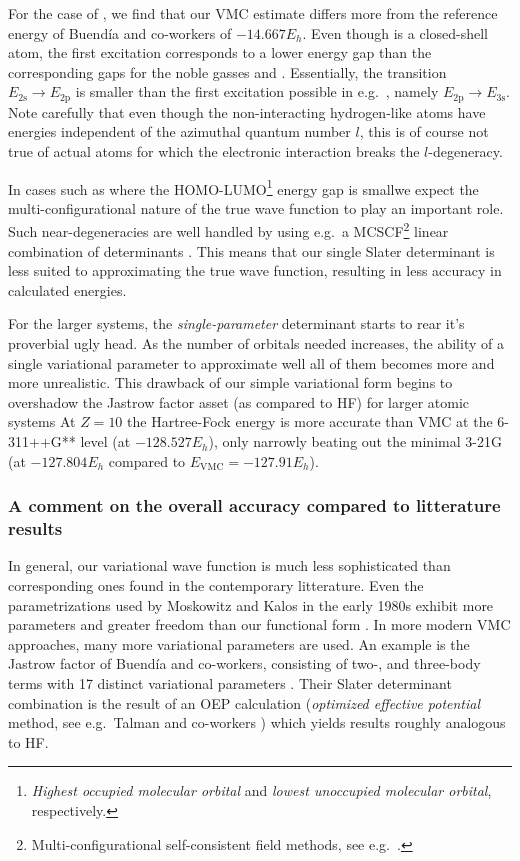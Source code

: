 \documentclass[../../master.tex]{subfiles}
\begin{document}
For the case of , we find that our VMC estimate differs more from the reference energy of Buendía and co-workers of $-14.667 E_h$. Even though  is a closed-shell atom, the first excitation corresponds to a lower energy gap than the corresponding gaps for the noble gasses  and . Essentially, the transition $E_\text{2s}\rightarrow E_\text{2p}$ is smaller than the first excitation possible in e.g.\ , namely $E_\text{2p}\rightarrow E_\text{3s}$. Note carefully that even though the non-interacting hydrogen-like atoms have energies independent of the azimuthal quantum number $l$, this is of course not true of actual atoms for which the electronic interaction breaks the $l$-degeneracy.  

In cases such as \textemdash where the HOMO-LUMO\footnote{\emph{Highest occupied molecular orbital} and \emph{lowest unoccupied molecular orbital}, respectively.} energy gap is small\textemdash we expect the multi-configurational nature of the true wave function to play an important role. Such near-degeneracies are well handled by using e.g.\ a MCSCF\footnote{Multi-configurational self-consistent field methods, see e.g.\ \cite{helgaker}.} linear combination of determinants \cite{BUENDIA2006241}. This means that our single Slater determinant is less suited to approximating the true wave function, resulting in less accuracy in calculated energies.

For the larger systems, the \emph{single-parameter} determinant starts to rear it's proverbial ugly head. As the number of orbitals needed increases, the ability of a single variational parameter to approximate well all of them becomes more and more unrealistic. This drawback of our simple variational form begins to overshadow the Jastrow factor asset (as compared to HF) for larger atomic systems At $Z=10$ the Hartree-Fock energy is more accurate than VMC at the 6-311++G** level (at $-128.527 E_h$), only narrowly beating out the minimal 3-21G (at $-127.804 E_h$ compared to $E_\text{VMC}=-127.91 E_h$).

\subsubsection{A comment on the overall accuracy compared to litterature results}
In general, our variational wave function is much less sophisticated than corresponding ones found in the contemporary litterature. Even the parametrizations used by Moskowitz and Kalos in the early 1980s exhibit more parameters and greater freedom than our functional form \cite{moskowitz1981new}. In more modern VMC approaches, many more variational parameters are used. An example is the Jastrow factor of Buendía and co-workers, consisting of two-, and three-body terms with 17 distinct variational parameters \cite{buendie}. Their Slater determinant combination is the result of an OEP calculation (\emph{optimized effective potential} method, see e.g.\ Talman and co-workers \cite{talman1976optimized}) which yields results roughly analogous to HF.  
\end{document}
